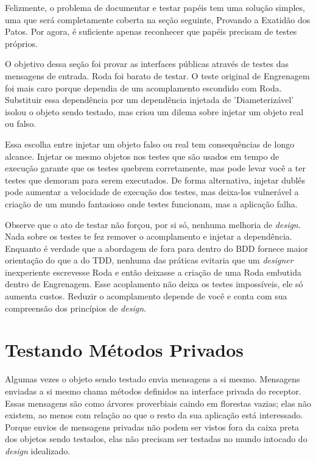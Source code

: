Felizmente, o problema de documentar e testar papéis tem uma solução simples,
uma que será completamente coberta na seção seguinte, Provando a Exatidão dos
Patos. Por agora, é suficiente apenas reconhecer que papéis precisam de testes
próprios.

O objetivo dessa seção foi provar as interfaces públicas através de testes das
mensagens de entrada. Roda foi barato de testar. O teste original de Engrenagem
foi mais caro porque dependia de um acomplamento escondido com Roda. Substituir
essa dependência por um dependência injetada de 'Diameterizável' isolou o
objeto sendo testado, mas criou um dilema sobre injetar um objeto real ou falso.

Essa escolha entre injetar um objeto falso ou real tem consequências de longo
alcance. Injetar os mesmo objetos nos testes que são usados em tempo de execução
garante que os testes quebrem corretamente, mas pode levar você a ter testes que
demoram para serem executados. De forma alternativa, injetar dublês pode
aumentar a velocidade de execução dos testes, mas deixa-los vulnerável a criação
de um mundo fantasioso onde testes funcionam, mas a aplicação falha.

Observe que o ato de testar não forçou, por si só, nenhuma melhoria de
\textit{design}. Nada sobre os testes te fez remover o acomplamento e injetar a
dependência. Enquanto é verdade que a abordagem de fora para dentro do BDD
fornece maior orientação do que a do TDD, nenhuma das práticas evitaria que um
\textit{designer} inexperiente escrevesse Roda e então deixasse a criação de
uma Roda embutida dentro de Engrenagem. Esse acoplamento não deixa os testes
impossíveis, ele só aumenta custos. Reduzir o acomplamento depende de você e
conta com sua compreensão dos princípios de \textit{design}.

\section{ Testando Métodos Privados }

Algumas vezes o objeto sendo testado envia mensagens a si mesmo. Mensagens
enviadas a si mesmo chama métodos definidos na interface privada do receptor.
Essas mensagens são como árvores proverbiais caindo em florestas vazias; elas
não existem, ao menos com relação ao que o resto da sua aplicação está
interessado. Porque envios de mensagens privadas não podem ser vistos fora da
caixa preta dos objetos sendo testados, elas não precisam ser testadas no mundo
intocado do \textit{design} idealizado.

